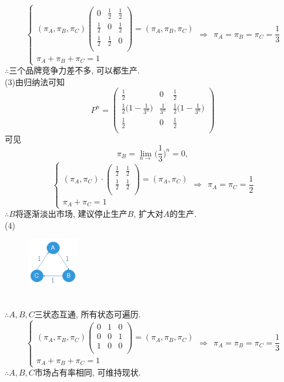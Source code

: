 \[
\begin{cases}
(\pi_A,\pi_B,\pi_C)
\begin{pmatrix}
0 & \frac{1}{2} & \frac{1}{2}\\
\frac{1}{2} & 0 & \frac{1}{2}\\
\frac{1}{2} & \frac{1}{2} & 0\\
\end{pmatrix}
=
(\pi_A,\pi_B,\pi_C)\\
\pi_A+\pi_B+\pi_C = 1
\end{cases}
\Rightarrow~~
\pi_A = \pi_B = \pi_C = \frac{1}{3}
\]
$\therefore$三个品牌竞争力差不多, 可以都生产.\\
(3)由归纳法可知
\[
P^n=
\begin{pmatrix}
\frac{1}{2} & 0 & \frac{1}{2}\\
\frac{1}{2}\big(1-\frac{1}{3^n}\big) & \frac{1}{3^n} & \frac{1}{2}\big(1-\frac{1}{3^n}\big)\\
\frac{1}{2} & 0 & \frac{1}{2}\\
\end{pmatrix}
\]
可见
\[
\pi_B = \lim_{n\rightarrow} \Big(\frac{1}{3}\Big)^n = 0,
\]
\[
\begin{cases}
(\pi_A, \pi_C)\cdot
	\begin{pmatrix}
	\frac{1}{2} & \frac{1}{2}\\
	\frac{1}{2} & \frac{1}{2}\\
	\end{pmatrix}
=
(\pi_A, \pi_C)\\
\pi_A + \pi_C = 1
\end{cases}
\Rightarrow~~
\pi_A = \pi_C = \frac{1}{2}
\]
$\therefore B$将逐渐淡出市场, 建议停止生产$B$, 扩大对$A$的生产.\\
(4)
\begin{figure}[htbp]
		\centering
		\includegraphics[width=0.2\textwidth]{resource/sp3_14_4.png}
\end{figure}\\
$\therefore A,B,C$三状态互通, 所有状态可遍历.\\
\[
\begin{cases}
(\pi_A,\pi_B,\pi_C)
\begin{pmatrix}
0 & 1 & 0\\
0 & 0 & 1\\
1 & 0 & 0\\
\end{pmatrix}
=
(\pi_A,\pi_B,\pi_C)\\
\pi_A+\pi_B+\pi_C = 1
\end{cases}
\Rightarrow~~
\pi_A = \pi_B = \pi_C = \frac{1}{3}
\]
$\therefore A,B,C$市场占有率相同, 可维持现状.\\


